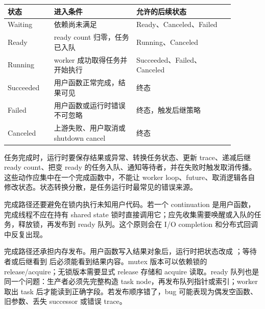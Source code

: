 \begin{center}
\begin{tabular}{p{0.18\linewidth}p{0.32\linewidth}p{0.38\linewidth}}
\toprule
状态 & 进入条件 & 允许的后续状态 \\
\midrule
Waiting & 依赖尚未满足 & Ready、Canceled、Failed \\
Ready & ready count 归零，任务已入队 & Running、Canceled \\
Running & worker 成功取得任务并开始执行 & Succeeded、Failed、Canceled \\
Succeeded & 用户函数正常完成，结果可见 & 终态 \\
Failed & 用户函数或运行时错误不可忽略 & 终态，触发后继策略 \\
Canceled & 上游失败、用户取消或 shutdown cancel & 终态 \\
\bottomrule
\end{tabular}
\end{center}

任务完成时，运行时要保存结果或异常、转换任务状态、更新 trace、递减后继 ready count、把变 ready 的任务入队、通知等待者，并在失败时触发取消传播。这些动作应集中在一个完成函数中，不能让 worker loop、future、取消逻辑各自修改状态。状态转换分散，是任务运行时最常见的错误来源。

完成路径还要避免在锁内执行未知用户代码。若一个 continuation 是用户函数，完成线程不应在持有 shared state 锁时直接调用它；应先收集需要唤醒或入队的任务，释放锁，再发布到 ready 队列。这个原则会在 I/O completion 和分布式回调中反复出现。

完成路径还承担内存发布。用户函数写入结果对象后，运行时把状态改成 ；等待者或后继看到  后必须能看到结果内容。mutex 版本可以依赖锁的 release/acquire；无锁版本需要显式 release 存储和 acquire 读取。ready 队列也是同一个问题：生产者必须先完整构造 task node，再发布队列指针或索引；worker 取出 task 后才能读到正确字段。若发布顺序错了，bug 可能表现为偶发空函数、旧参数、丢失 successor 或错误 trace。

